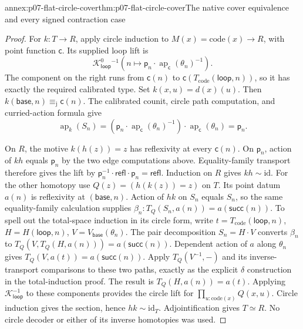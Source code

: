 \begin{annexitem}{annex:p07-flat-circle-cover}{thm:p07-flat-circle-cover}{The native cover equivalence and every signed contraction case}
\begin{proof}
For \(k:T\to R\), apply circle induction to
\(M(x)=\mathrm{code}(x)\to R\), with point function \(\mathsf c\).
Its supplied loop lift is
\[
\mathcal K^0_{\mathsf{loop}}{}^{-1}
\left(n\mapsto
 \mathsf p_n\cdot\operatorname{ap}_{\mathsf c}(\theta_n)^{-1}
\right).
\]
The component on the right runs from \(\mathsf c(n)\) to
\(\mathsf c(T_{\mathrm{code}}(\mathsf{loop},n))\), so it has
exactly the required calibrated type. Set \(k(x,u)=d(x)(u)\).
Then \(k(\mathsf{base},n)\equiv_{\mathrm j}\mathsf c(n)\).
The calibrated counit, circle path computation, and curried-action
formula give
\[
\operatorname{ap}_k(S_n)
 =(\mathsf p_n\cdot\operatorname{ap}_{\mathsf c}(\theta_n)^{-1})
       \cdot\operatorname{ap}_{\mathsf c}(\theta_n)
 =\mathsf p_n.
\]

On \(R\), the motive \(k(h(z))=z\) has reflexivity at every
\(\mathsf c(n)\). On \(\mathsf p_n\), action of \(kh\) equals
\(\mathsf p_n\) by the two edge computations above.
Equality-family transport therefore gives the lift by
\(\mathsf p_n^{-1}\cdot\mathsf{refl}\cdot\mathsf p_n
 =\mathsf{refl}\). Induction on \(R\) gives \(kh\sim\mathrm{id}\).
For the other homotopy use \(Q(z)=(h(k(z))=z)\) on \(T\).
Its point datum \(a(n)\) is reflexivity at \((\mathsf{base},n)\).
Action of \(hk\) on \(S_n\) equals \(S_n\), so the same
equality-family calculation supplies
\(\beta_n:T_Q(S_n,a(n))=a(\mathsf{succ}(n))\).
To spell out the total-space induction in its circle form,
write \(t=T_{\mathrm{code}}(\mathsf{loop},n)\),
\(H=H(\mathsf{loop},n)\), \(V=V_{\mathsf{base}}(\theta_n)\).
The pair decomposition \(S_n=H\cdot V\) converts \(\beta_n\)
to \(T_Q(V,T_Q(H,a(n)))=a(\mathsf{succ}(n))\).
Dependent action of \(a\) along \(\theta_n\) gives
\(T_Q(V,a(t))=a(\mathsf{succ}(n))\).
Apply \(T_Q(V^{-1},-)\) and its inverse-transport comparisons
to these two paths, exactly as the explicit \(\delta\) construction
in the total-induction proof. The result is
\(T_Q(H,a(n))=a(t)\).
Applying \(\mathcal K_{\mathsf{loop}}^{-1}\) to these components
provides the circle lift for
\(\prod_{u:\mathrm{code}(x)}Q(x,u)\).
Circle induction gives the section, hence \(hk\sim\mathrm{id}_T\).
Adjointification gives \(T\simeq R\). No circle decoder or either
of its inverse homotopies was used.


\end{proof}
\end{annexitem}
